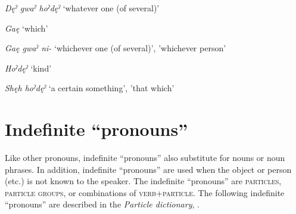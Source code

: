 \begin{CayugaRelated}
\item{} \textit{Dęˀ gwaˀ hoˀdęˀ} ‘whatever one (of several)’\\
\item{} \textit{Gaę} ‘which’\\
\item{} \textit{Gaę gwaˀ ni-} ‘whichever one (of several)’, 'whichever person’\\
\item{} \textit{Hoˀdęˀ} ‘kind’\\
\item{} \textit{Shęh hoˀdęˀ} ‘a certain something’, 'that which’\\
\end{CayugaRelated}


\section{Indefinite “pronouns”} \label{ch:’Indefinite pronouns’}
Like other pronouns, indefinite “pronouns” also substitute for nouns or noun phrases. In addition, indefinite “pronouns” are used when the object or person (etc.) is not known to the speaker. The indefinite “pronouns” are \textsc{particles}, \textsc{particle groups}, or combinations of \textsc{verb+particle}. The following indefinite “pronouns” are described in the \textit{Particle dictionary}, . 


